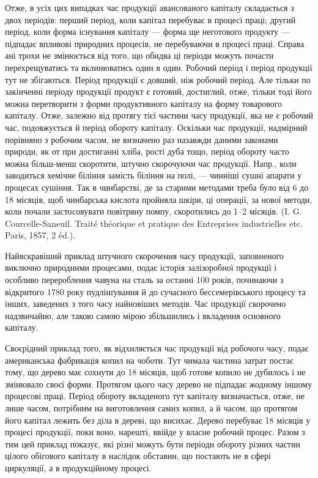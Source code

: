 Отже, в усіх цих випадках час продукції авансованого капіталу складається
з двох періодів: перший період, коли капітал перебуває в процесі
праці; другий період, коли форма існування капіталу — форма ще неготового
продукту — підпадає впливові природних процесів, не перебуваючи
в процесі праці. Справа ані трохи не змінюється від того, що обидва ці
періоди можуть почасти перехрещуватись та вклинюватись один в один.
Робочий період і період продукції тут не збігаються. Період продукції
є довший, ніж робочий період. Але тільки по закінченні періоду продукції
продукт є готовий, достиглий, отже, тільки тоді його можна перетворити
з форми продуктивного капіталу на форму товарового капіталу.
Отже, залежно від протягу тієї частини часу продукції, яка не є
робочий час, подовжується й період обороту капіталу. Оскільки час продукції,
надмірний порівняно з робочим часом, не визначено раз назавжди
даними законами природи, як от при достиганні хліба, рості дуба тощо,
період обороту часто можна більш-менш скоротити, штучно скорочуючи
час продукції. Напр., коли заводиться хемічне біління замість біління
на полі, — чинніші сушні апарати у процесах сушіння. Так в чинбарстві,
де за старими методами треба було від 6 до 18 місяців, щоб
чинбарська кислота пройняла шкіри, ці операції, за нової методи, коли
почали застосовувати повітряну помпу, скоротились до 1--2 місяців.
(I. G. Courcelle-Saneuil. Traité théorique et pratique des Entreprises industrielles
etc. Paris, 1857, 2 éd.).

Найяскравіший приклад штучного скорочення часу продукції, заповненого
виключно природними процесами, подає історія залізоробної
продукції і особливо перероблення чавуна на сталь за останні 100 років,
починаючи з відкритого 1780 року пудлінґування й до сучасного бессемерівського
процесу та інших, заведених з того часу найновіших методів.
Час продукції скорочено надзвичайно, але такою самою мірою збільшились
і вкладення основного капіталу.

Своєрідний приклад того, як відхиляється час продукції від робочого
часу, подає американська фабрикація копил на чоботи. Тут чимала частина
затрат постає тому, що дерево має сохнути до 18 місяців, щоб
готове копило не дубилось і не змінювало своєї форми. Протягом цього
часу дерево не підпадає жодному іншому процесові праці. Період обороту
вкладеного тут капіталу визначається, отже, не лише часом, потрібним
на виготовлення самих копил, а й часом, що протягом його капітал
лежить без діла в дереві, що висихає. Дерево перебуває 18 місяців
у процесі продукції, поки воно, нарешті, ввійде у власне робочий процес.
Разом з тим цей приклад показує, які різні можуть бути періоди обороту
різних частин цілого обігового капіталу в наслідок обставин, що постають
не в сфері циркуляції, а в продукційному процесі.

